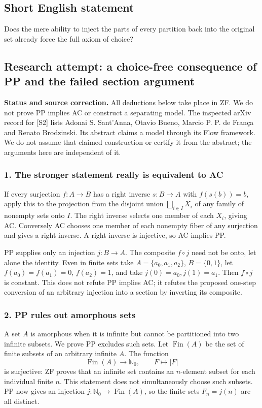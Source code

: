 \documentclass[11pt,a4paper]{article}
\begin{document}
\subsection{Short English statement}

Does the mere ability to inject the parts of every partition back into the original set already force the full axiom of choice?

\subsection{Research attempt: a choice-free consequence of PP and the failed section argument}
\textbf{Status and source correction.} All deductions below take place in ZF. We do not prove PP implies AC or construct a separating model. The inspected arXiv record for [S2] lists Adonai S. Sant'Anna, Otavio Bueno, Marcio P. P. de França and Renato Brodzinski. Its abstract claims a model through its Flow framework. We do not assume that claimed construction or certify it from the abstract; the arguments here are independent of it.

\subsubsection{1. The stronger statement really is equivalent to AC}
If every surjection $f:A\to B$ has a right inverse $s:B\to A$ with $f(s(b))=b$, apply this to the projection from the disjoint union $\bigsqcup_{i\in I}X_i$ of any family of nonempty sets onto $I$. The right inverse selects one member of each $X_i$, giving AC. Conversely AC chooses one member of each nonempty fiber of any surjection and gives a right inverse. A right inverse is injective, so AC implies PP.

PP supplies only an injection $j:B\to A$. The composite $f\circ j$ need not be onto, let alone the identity. Even in finite sets take $A=\{a_0,a_1,a_2\}$, $B=\{0,1\}$, let $f(a_0)=f(a_1)=0$, $f(a_2)=1$, and take $j(0)=a_0,j(1)=a_1$. Then $f\circ j$ is constant. This does not refute PP implies AC; it refutes the proposed one-step conversion of an arbitrary injection into a section by inverting its composite.

\subsubsection{2. PP rules out amorphous sets}
A set $A$ is amorphous when it is infinite but cannot be partitioned into two infinite subsets. We prove PP excludes such sets. Let $\operatorname{Fin}(A)$ be the set of finite subsets of an arbitrary infinite $A$. The function
\[\operatorname{Fin}(A)\longrightarrow\mathbb N_0,\qquad F\longmapsto|F|
\]
is surjective: ZF proves that an infinite set contains an $n$-element subset for each individual finite $n$. This statement does not simultaneously choose such subsets. PP now gives an injection $j:\mathbb N_0\to\operatorname{Fin}(A)$, so the finite sets $F_n=j(n)$ are all distinct.
\end{document}
